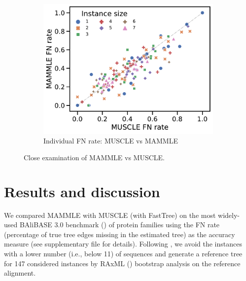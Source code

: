 \begin{figure}[!htbp]
\begin{adjustwidth}{-1.1cm}{}
		\begin{subfigure}{0.40\textwidth} \includegraphics[width=\textwidth]{Figure/delta5} \caption{Individual FN rate: MUSCLE vs MAMMLE}\end{subfigure}
	\end{adjustwidth}
	\caption{Close examination of MAMMLE vs MUSCLE.}
	\label{fig:PMAO}
\end{figure}

\section{Results and discussion }
We compared MAMMLE with MUSCLE (with FastTree) on the most widely-used BAliBASE 3.0 benchmark (\cite{thompson2005balibase}) of protein families using the FN rate (percentage of true tree edges missing in the estimated tree) as the accuracy measure (see supplementary file for details). Following \cite{mirarab2015pasta}, we avoid the instances with a lower number (i.e., below 11) of sequences and generate a reference tree for 147 considered instances by RAxML (\cite{stamatakis2014raxml}) bootstrap analysis on the reference alignment.


